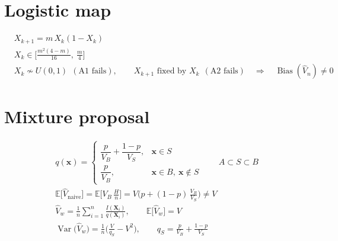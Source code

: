 \documentclass[12pt,a4paper,fleqn]{article}
\numberwithin{equation}{section}
\newcommand{\I}{I}
\newcommand{\E}{\mathbb{E}}
\newcommand{\Var}{\operatorname{Var}}
\newcommand{\Bias}{\operatorname{Bias}}
\newcommand{\bx}{\mathbf{x}}
\newcommand{\bX}{\mathbf{X}}
\begin{document}
\section{Logistic map}
\begin{align}
&X_{k+1}=m\,X_k(1-X_k)\\
&X_k\in\Big[\frac{m^2(4-m)}{16},\ \frac m4\Big]\\
&X_k\nsim U(0,1)\ \ (\text{A1 fails}),\qquad X_{k+1}\text{ fixed by }X_k\ \ (\text{A2 fails})
\quad\Rightarrow\quad\Bias(\hat V_n)\neq0
\end{align}

\section{Mixture proposal}
\begin{align}
&q(\bx)=\begin{cases}\dfrac{p}{V_B}+\dfrac{1-p}{V_S}, & \bx\in S\\[8pt] \dfrac{p}{V_B}, & \bx\in B,\ \bx\notin S\end{cases}
\qquad A\subset S\subset B\\
&\E\big[\hat V_{\mathrm{naive}}\big]=\E\Big[V_B\,\frac Hn\Big]=V\Big(p+(1-p)\,\frac{V_B}{V_S}\Big)\neq V\\
&\hat V_w=\frac1n\sum_{i=1}^n\frac{\I(\bX_i)}{q(\bX_i)},\qquad
\E\big[\hat V_w\big]=V\\
&\Var\big(\hat V_w\big)=\frac1n\Big(\frac{V}{q_S}-V^2\Big),\qquad q_S=\frac{p}{V_B}+\frac{1-p}{V_S}
\end{align}
\end{document}
